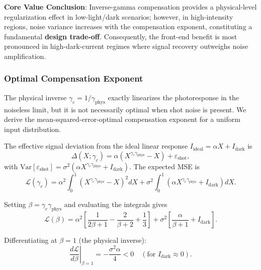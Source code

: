\textbf{Core Value Conclusion}: Inverse-gamma compensation provides a physical-level regularization effect in low-light/dark scenarios; however, in high-intensity regions, noise variance increases with the compensation exponent, constituting a fundamental \textbf{design trade-off}. Consequently, the front-end benefit is most pronounced in high-dark-current regimes where signal recovery outweighs noise amplification.

\subsubsection{Optimal Compensation Exponent}
\label{note:optimal-gamma}

The physical inverse $\gamma_c = 1/\gamma_{\text{phys}}$ exactly linearizes the photoresponse in the noiseless limit, but it is not necessarily optimal when shot noise is present. We derive the mean-squared-error-optimal compensation exponent for a uniform input distribution.

The effective signal deviation from the ideal linear response $I_{\text{ideal}} = \alpha X + I_{\text{dark}}$ is
\begin{equation}
    \Delta(X; \gamma_c) = \alpha \left(X^{\gamma_c \gamma_{\text{phys}}} - X\right) + \varepsilon_{\text{shot}},
\end{equation}
with $\text{Var}[\varepsilon_{\text{shot}}] = \sigma^2 (\alpha X^{\gamma_c \gamma_{\text{phys}}} + I_{\text{dark}})$. The expected MSE is
\begin{equation}
    \mathcal{L}(\gamma_c) = \alpha^2 \int_0^1 \!\left(X^{\gamma_c \gamma_{\text{phys}}} - X\right)^2 dX + \sigma^2 \int_0^1 \!\left(\alpha X^{\gamma_c \gamma_{\text{phys}}} + I_{\text{dark}}\right) dX.
\end{equation}

Setting $\beta = \gamma_c \gamma_{\text{phys}}$ and evaluating the integrals gives
\begin{equation}
    \mathcal{L}(\beta) = \alpha^2\!\left[\frac{1}{2\beta+1} - \frac{2}{\beta+2} + \frac{1}{3}\right] + \sigma^2\!\left[\frac{\alpha}{\beta+1} + I_{\text{dark}}\right].
\end{equation}

Differentiating at $\beta = 1$ (the physical inverse):
\begin{equation}
    \left.\frac{d\mathcal{L}}{d\beta}\right|_{\beta=1} = -\frac{\sigma^2 \alpha}{4} < 0 \quad (\text{for } I_{\text{dark}} \approx 0).
\end{equation}

